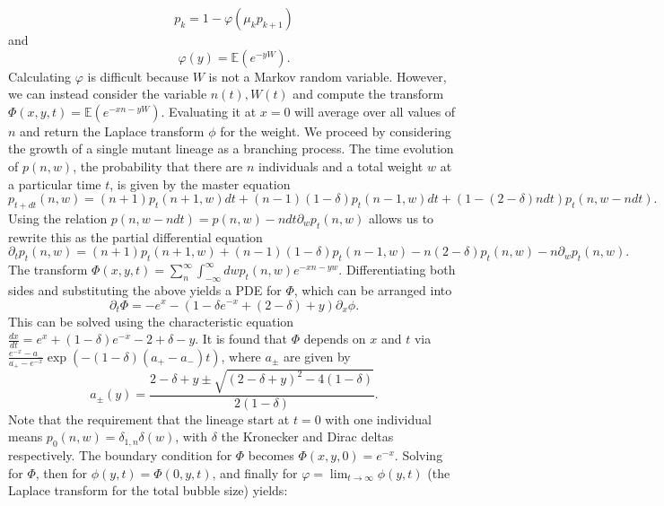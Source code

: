 \documentclass[10pt]{revtex4}
\begin{document}
\begin{equation}
p_k = 1-\varphi(\mu_k p_{k+1})
\end{equation}
and
\begin{equation}
\varphi(y) = \mathbb{E}(e^{-yW}).
\end{equation}
Calculating $\varphi$ is difficult because $W$ is not a Markov random variable. 
However, we can instead consider the variable $n(t), W(t)$ and compute the transform $\Phi (x,y,t) = \mathbb{E}(e^{-xn-yW})$.
Evaluating it at $x=0$ will average over all values of $n$ and return the Laplace transform $\phi$ for the weight.
We proceed by considering the growth of a single mutant lineage as a branching process.
The time evolution of $p(n,w)$, the probability that there are $n$ individuals and a total weight $w$ at a particular time $t$, is given by the master equation
\begin{equation}
p_{t+dt}(n,w) = (n+1)p_t(n+1,w)dt + (n-1)(1-\delta)p_t(n-1,w)dt + (1-(2-\delta)ndt)p_t(n,w-ndt).
\end{equation}
Using the relation $p(n,w-ndt) = p(n,w)-ndt\partial_w p_t(n,w)$ allows us to rewrite this as the partial differential equation
\begin{equation}
\partial_t p_t (n,w) = (n+1)p_t(n+1,w) + (n-1)(1-\delta) p_t(n-1,w) - n(2-\delta)p_t(n,w)-n\partial_w p_t(n,w).
\end{equation}
The transform $\Phi(x,y,t) = \sum_n^\infty \int_{-\infty}^\infty dw p_t(n,w) e^{-xn-yw}$.
Differentiating both sides and substituting the above yields a PDE for $\Phi$, which can be arranged into
\begin{equation}
\partial_t \Phi = -e^x - (1-\delta e^{-x} + (2-\delta) + y)\partial_x \phi .
\end{equation}
This can be solved using the characteristic equation $\frac{dx}{dt} = e^x + (1-\delta)e^{-x} - 2+\delta-y$.
It is found that $\Phi$ depends on $x$ and $t$ via $\frac{e^{-x}-a_{-}}{a_{+}-e^{-x}} \exp(-(1-\delta)(a_{+} - a_{-})t)$, where $a_{\pm}$ are given by
\begin{equation}
a_{\pm}(y) = \frac{2-\delta+y \pm \sqrt{(2-\delta+y)^2 -4(1-\delta)}}{2(1-\delta)}.
\end{equation}
Note that the requirement that the lineage start at $t=0$ with one individual means $p_0(n,w) = \delta_{1,n} \delta (w)$, with $\delta$ the Kronecker and Dirac deltas respectively.
The boundary condition for $\Phi$ becomes $\Phi(x,y,0) = e^{-x}$.
Solving for $\Phi$, then for $\phi(y,t) = \Phi(0,y,t)$, and finally for $\varphi = \lim_{t\to \infty} \phi (y,t)$ (the Laplace transform for the total bubble size) yields:
\end{document}
